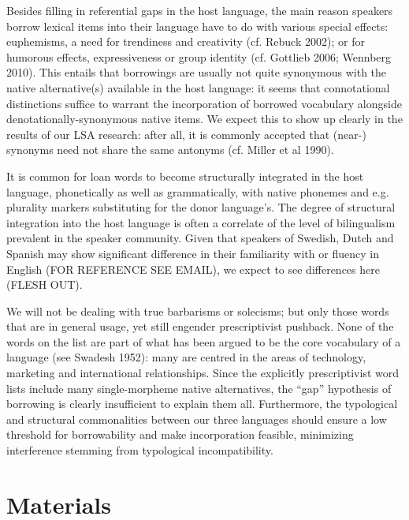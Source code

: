 \documentclass[a4paper]{article}
\begin{document}
Besides filling in referential gaps in the host language, the main reason speakers borrow lexical items into their language have to do with various special effects: euphemisms, a need for trendiness and creativity (cf. Rebuck 2002); or for humorous effects, expressiveness or group identity (cf. Gottlieb 2006; Wennberg 2010). This entails that borrowings are usually not quite synonymous with the native alternative(s) available in the host language: it seems that connotational distinctions suffice to warrant the incorporation of borrowed vocabulary alongside denotationally-synonymous native items. We expect this to show up clearly in the results of our LSA research: after all, it is commonly accepted that (near-) synonyms need not share the same antonyms (cf. Miller et al 1990). 

It is common for loan words to become structurally integrated in the host language, phonetically as well as grammatically, with native phonemes and e.g. plurality markers substituting for the donor language's. The degree of structural integration into the host language is often a correlate of the level of bilingualism prevalent in the speaker community. Given that speakers of Swedish, Dutch and Spanish may show significant difference in their familiarity with or fluency in English (FOR REFERENCE SEE EMAIL), we expect to see differences here (FLESH OUT). 

We will not be dealing with true barbarisms or solecisms; but only those words that are in general usage, yet still engender prescriptivist pushback. None of the words on the list are part of what has been argued to be the core vocabulary of a language (see Swadesh 1952): many are centred in the areas of technology, marketing and international relationships. Since the explicitly prescriptivist word lists include many single-morpheme native alternatives, the ``gap'' hypothesis of borrowing is clearly insufficient to explain them all. Furthermore, the typological and structural commonalities between our three languages should ensure a low threshold for borrowability and make incorporation feasible, minimizing interference stemming from typological incompatibility.




\cite{Matras2009}

\section{Materials} 
\end{document}
